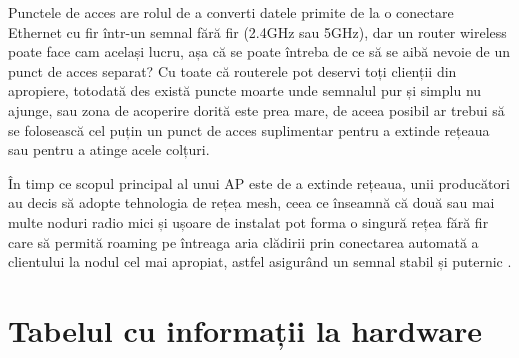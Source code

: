 \documentclass[a4paper,12pt]{report}
\begin{document}
Punctele de acces are rolul de a converti datele primite de la o conectare Ethernet cu fir într-un semnal fără fir (2.4GHz sau 5GHz), dar un router wireless poate face cam același lucru, așa că se poate întreba de ce să se aibă nevoie de un punct de acces separat?
Cu toate că routerele pot deservi toți clienții din apropiere, totodată des există puncte moarte unde semnalul pur și simplu nu ajunge, sau zona de acoperire dorită este prea mare, de aceea posibil ar trebui să se folosească cel puțin un punct de acces suplimentar pentru a extinde rețeaua sau pentru a atinge acele colțuri.

În timp ce scopul principal al unui \ac{AP} este de a extinde rețeaua, unii producători au decis să adopte tehnologia de rețea mesh, ceea ce înseamnă că două sau mai multe noduri radio mici și ușoare de instalat pot forma o singură rețea fără fir care să permită roaming pe întreaga aria clădirii prin conectarea automată a clientului la nodul cel mai apropiat, astfel asigurând un semnal stabil și puternic \cite{wireless_mesh_network_wiki}.

\section{Tabelul cu informații la hardware}
\end{document}
